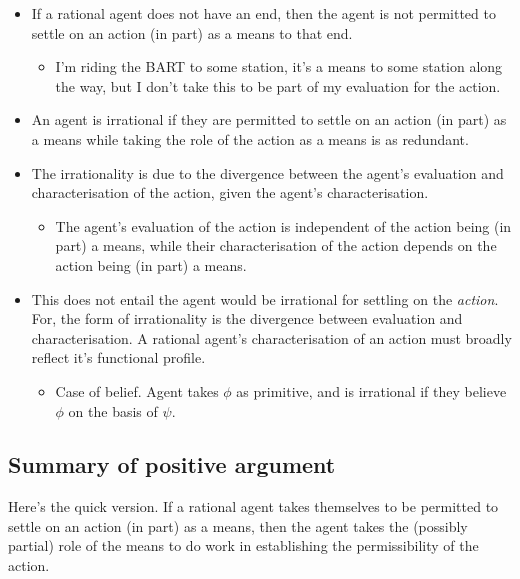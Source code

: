 \documentclass[10pt]{article}
\newcommand{\hozlinedash}[0]{%
  \noindent\hdashrule[0.5ex][c]{\textwidth}{.1pt}{2.5pt}
}
\begin{document}
\begin{itemize}
\item {\color{red} If a rational agent does not have an end, then the agent is not permitted to settle on an action (in part) as a means to that end.}
  \begin{itemize}
  \item I'm riding the BART to some station, it's a means to some station along the way, but I don't take this to be part of my evaluation for the action.
  \end{itemize}
\item An agent is irrational if they are permitted to settle on an action (in part) as a means while taking the role of the action as a means is as redundant.
\item The irrationality is due to the divergence between the agent's evaluation and characterisation of the action, given the agent's characterisation.
  \begin{itemize}
  \item The agent's evaluation of the action is independent of the action being (in part) a means, while their characterisation of the action depends on the action being (in part) a means.
  \end{itemize}
\item This does not entail the agent would be irrational for settling on the \emph{action}.
  For, the form of irrationality is the divergence between evaluation and characterisation.
  A rational agent's characterisation of an action must broadly reflect it's functional profile.
  \begin{itemize}
  \item Case of belief.
    Agent takes \(\phi\) as primitive, and is irrational if they believe \(\phi\) on the basis of \(\psi\).
  \end{itemize}
\end{itemize}


\hozlinedash



\subsection{Summary of positive argument}
\label{sec:summary-1}

Here's the quick version.
If a rational agent takes themselves to be permitted to settle on an action (in part) as a means, then the agent takes the (possibly partial) role of the means to do work in establishing the permissibility of the action.
\end{document}
